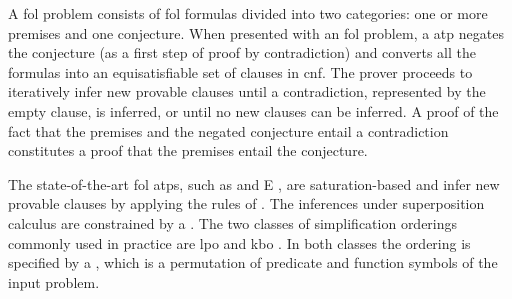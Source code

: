 




A \gls{fol} problem consists of \gls{fol} formulas divided into two categories:
one or more premises and one conjecture.
When presented with an \gls{fol} problem,
a  \gls{atp} negates the conjecture (as a first step of proof by contradiction)
and converts all the formulas into an equisatisfiable set of clauses in \gls{cnf}.
The prover proceeds to iteratively infer new provable clauses
until a contradiction, represented by the empty clause, is inferred,
or until no new clauses can be inferred.
A proof of the fact that the premises and the negated conjecture entail a contradiction
constitutes a proof that the premises entail the conjecture.

The state-of-the-art \gls{fol} \glspl{atp},
such as \vampire{} \cite{10.1007/978-3-642-39799-8_1} and E \cite{10.1007/978-3-030-29436-6_29},
are saturation-based and
infer new provable clauses by applying the rules of .
The inferences under superposition calculus are constrained by a .
The two classes of simplification orderings commonly used in practice are
\gls{lpo} \cite{Kamin1980} and \gls{kbo} \cite{Knuth1983}.
In both classes the ordering is specified by a ,
which is a permutation of predicate and function symbols of the input problem.

